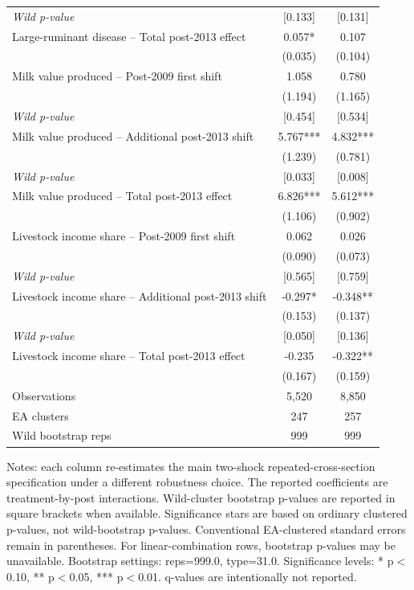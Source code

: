 \begin{table}[!htbp]
\begin{tabular}{lcc}
\emph{Wild p-value} & [0.133] & [0.131] \\
Large-ruminant disease -- Total post-2013 effect & 0.057* & 0.107 \\
  & (0.035) & (0.104) \\
\addlinespace
Milk value produced -- Post-2009 first shift & 1.058 & 0.780 \\
  & (1.194) & (1.165) \\
\emph{Wild p-value} & [0.454] & [0.534] \\
Milk value produced -- Additional post-2013 shift & 5.767*** & 4.832*** \\
  & (1.239) & (0.781) \\
\emph{Wild p-value} & [0.033] & [0.008] \\
Milk value produced -- Total post-2013 effect & 6.826*** & 5.612*** \\
  & (1.106) & (0.902) \\
\addlinespace
Livestock income share -- Post-2009 first shift & 0.062 & 0.026 \\
  & (0.090) & (0.073) \\
\emph{Wild p-value} & [0.565] & [0.759] \\
Livestock income share -- Additional post-2013 shift & -0.297* & -0.348** \\
  & (0.153) & (0.137) \\
\emph{Wild p-value} & [0.050] & [0.136] \\
Livestock income share -- Total post-2013 effect & -0.235 & -0.322** \\
  & (0.167) & (0.159) \\
\addlinespace
\midrule
Observations & 5,520 & 8,850 \\
EA clusters & 247 & 257 \\
Wild bootstrap reps & 999 & 999 \\
\bottomrule
\end{tabular}
\begin{minipage}{0.96\textwidth}\vspace{0.3em}\footnotesize Notes: each column re-estimates the main two-shock repeated-cross-section specification under a different robustness choice. The reported coefficients are treatment-by-post interactions. Wild-cluster bootstrap p-values are reported in square brackets when available. Significance stars are based on ordinary clustered p-values, not wild-bootstrap p-values. Conventional EA-clustered standard errors remain in parentheses. For linear-combination rows, bootstrap p-values may be unavailable.  Bootstrap settings: reps=999.0, type=31.0. Significance levels: * p$<$0.10, ** p$<$0.05, *** p$<$0.01. q-values are intentionally not reported.\end{minipage}
\end{table}
